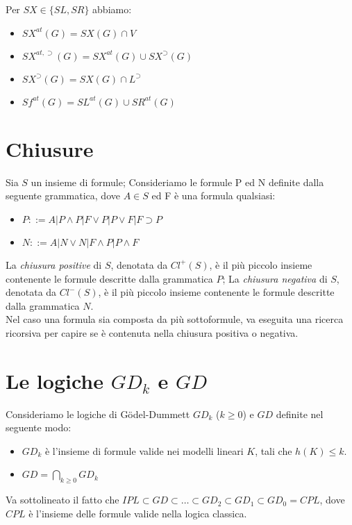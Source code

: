 \documentclass[\main/tesi.tex]{subfiles}
\begin{document}
Per $SX \in \{SL, SR\}$ abbiamo:
\begin{itemize}
    \item $SX^{at}(G) = SX(G) \cap V$
    \item $SX^{at, \supset}(G) = SX^{at}(G) \cup SX^{\supset}(G)$
    \item $SX^{\supset}(G) = SX(G) \cap L^{\supset}$
    \item $Sf^{at}(G) = SL^{at}(G) \cup SR^{at}(G)$
\end{itemize}

\newpage

\section{Chiusure}

Sia $S$ un insieme di formule; Consideriamo le formule P ed N definite dalla seguente grammatica, dove $A \in S$ ed F è una formula qualsiasi:
\begin{itemize}
    \item $P ::= A|P \land P|F \lor P|P \lor F|F \supset P$
    \item $N ::= A|N \lor N|F \land P|P \land F$
\end{itemize}
La \textit{chiusura positive} di $S$, denotata da $Cl^+(S)$, è il più piccolo insieme contenente le formule descritte dalla grammatica $P$;
La \textit{chiusura negativa} di $S$, denotata da $Cl^-(S)$, è il più piccolo insieme contenente le formule descritte dalla grammatica $N$. \\

Nel caso una formula sia composta da più sottoformule, va eseguita una ricerca ricorsiva per capire se è contenuta nella chiusura positiva o negativa. \\

\section{Le logiche $GD_k$ e $GD$}

Consideriamo le logiche di G\"odel-Dummett $GD_k$ ($k \geq 0$) e $GD$ definite nel seguente modo:
\begin{itemize}
    \item $GD_k$ è l'insieme di formule valide nei modelli lineari $K$, tali che $h(K) \leq k$.
    \item $GD = \bigcap_{k \geq 0}GD_k$
\end{itemize}
Va sottolineato il fatto che $IPL \subset GD \subset \dots \subset GD_2 \subset GD_1 \subset GD_0 = CPL$, dove $CPL$ è l'insieme delle formule valide nella logica classica.
\end{document}
